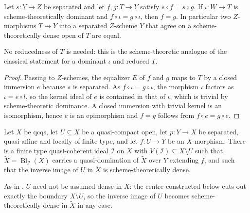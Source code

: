 \begin{lemma}
  \label{lemma:nagata-ext-scheme-theoretically-dominant-separated}
  \leanok

  Let $s\colon Y\to Z$ be separated and let $f,g\colon T\to Y$ satisfy
  $s\circ f=s\circ g$.  If $\iota\colon W\to T$ is scheme-theoretically
  dominant and $f\circ\iota=g\circ\iota$, then $f=g$.  In particular two
  $Z$-morphisms $T\to Y$ into a separated $Z$-scheme $Y$ that agree on a
  scheme-theoretically dense open of $T$ are equal.

  No reducedness of $T$ is needed: this is the scheme-theoretic analogue of the
  classical statement for a dominant $\iota$ and reduced $T$.
\end{lemma}

\begin{proof}
  \leanok
  Passing to $Z$-schemes, the equalizer $E$ of $f$ and $g$ maps to $T$ by a
  closed immersion $e$ because $s$ is separated.  As $f\circ\iota=g\circ\iota$,
  the morphism $\iota$ factors as $\iota=e\circ l$, so the kernel ideal of $e$
  is contained in that of $\iota$, which is trivial by scheme-theoretic
  dominance.  A closed immersion with trivial kernel is an isomorphism, hence
  $e$ is an epimorphism and $f=g$ follows from $f\circ e=g\circ e$.
\end{proof}

\begin{lemma}[Quasi-affine target over a qcqs base, $U=V$,
  {\cite[Thm.~2.4, Case 2, pp.~15--16]{ConradNagata}}]
  \label{lemma:nagata-conrad-quasi-affine-equal-opens}
  \leanok

  Let $X$ be qcqs, let $U\subseteq X$ be a quasi-compact open, let
  $p\colon Y\to X$ be separated, quasi-affine and locally of finite type, and
  let $f\colon U\to Y$ be an $X$-morphism.  There is a finite type
  quasi-coherent ideal $\mathcal I$ on $X$ with
  $V(\mathcal I)\subseteq X\setminus U$ such that
  $\widetilde X=\operatorname{Bl}_{\mathcal I}(X)$ carries a quasi-domination
  of $\widetilde X$ over $Y$ extending $f$, and such that the inverse image of
  $U$ in $\widetilde X$ is scheme-theoretically dense.

  As in , $U$ need not be
  assumed dense in $X$: the centre constructed below cuts out exactly the
  boundary $X\setminus U$, so the inverse image of $U$ becomes
  scheme-theoretically dense in $\widetilde X$ in any case.
\end{lemma}

